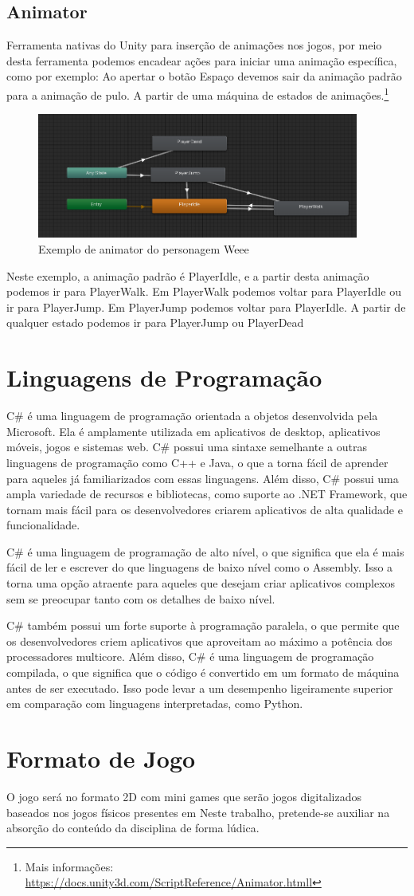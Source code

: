 \subsection{Animator}
Ferramenta nativas do Unity para inserção de animações nos jogos, por meio desta ferramenta podemos encadear ações para iniciar uma animação específica, como por exemplo: Ao apertar o botão Espaço devemos sair da animação padrão para a animação de pulo. A partir de uma máquina de estados de animações.\footnote{Mais informações: \url{https://docs.unity3d.com/ScriptReference/Animator.htmll}}
\begin{figure}[!h]
    \centering
    \includegraphics[width=400px]{figuras/animator.png}
    \caption{Exemplo de animator do personagem Weee}
    \label{fig_animator}
\end{figure}
Neste exemplo, a animação padrão é PlayerIdle, e a partir desta animação podemos ir para PlayerWalk. Em PlayerWalk podemos voltar para PlayerIdle ou ir para PlayerJump. Em PlayerJump podemos voltar para PlayerIdle. A partir de qualquer estado podemos ir para PlayerJump ou PlayerDead

\section{Linguagens de Programação}
C\# é uma linguagem de programação orientada a objetos desenvolvida pela Microsoft. Ela é amplamente utilizada em aplicativos de desktop, aplicativos móveis, jogos e sistemas web. C\# possui uma sintaxe semelhante a outras linguagens de programação como C++ e Java, o que a torna fácil de aprender para aqueles já familiarizados com essas linguagens. Além disso, C\# possui uma ampla variedade de recursos e bibliotecas, como suporte ao .NET Framework, que tornam mais fácil para os desenvolvedores criarem aplicativos de alta qualidade e funcionalidade.
\par
C\# é uma linguagem de programação de alto nível, o que significa que ela é mais fácil de ler e escrever do que linguagens de baixo nível como o Assembly. Isso a torna uma opção atraente para aqueles que desejam criar aplicativos complexos sem se preocupar tanto com os detalhes de baixo nível.
\par
C\# também possui um forte suporte à programação paralela, o que permite que os desenvolvedores criem aplicativos que aproveitam ao máximo a potência dos processadores multicore. Além disso, C\# é uma linguagem de programação compilada, o que significa que o código é convertido em um formato de máquina antes de ser executado. Isso pode levar a um desempenho ligeiramente superior em comparação com linguagens interpretadas, como Python.

\section{Formato de Jogo}
O jogo será no formato 2D com mini games que serão jogos digitalizados baseados nos jogos físicos presentes em \cite{bell1998computerIHC}
Neste trabalho, pretende-se auxiliar na absorção do conteúdo da disciplina de forma lúdica. 